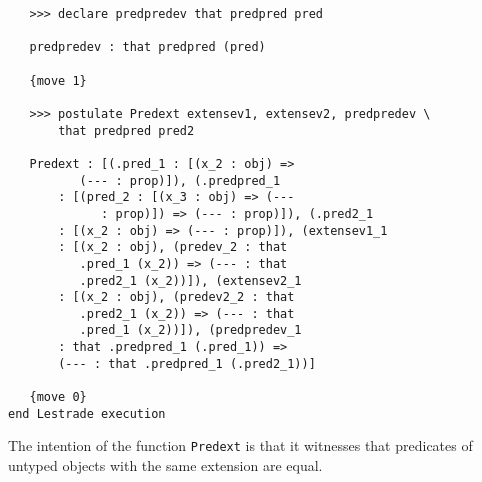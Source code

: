 \documentclass[12pt]{article}
\begin{document}
\begin{verbatim}
   >>> declare predpredev that predpred pred

   predpredev : that predpred (pred)

   {move 1}

   >>> postulate Predext extensev1, extensev2, predpredev \
       that predpred pred2

   Predext : [(.pred_1 : [(x_2 : obj) => 
          (--- : prop)]), (.predpred_1 
       : [(pred_2 : [(x_3 : obj) => (--- 
             : prop)]) => (--- : prop)]), (.pred2_1 
       : [(x_2 : obj) => (--- : prop)]), (extensev1_1 
       : [(x_2 : obj), (predev_2 : that 
          .pred_1 (x_2)) => (--- : that 
          .pred2_1 (x_2))]), (extensev2_1 
       : [(x_2 : obj), (predev2_2 : that 
          .pred2_1 (x_2)) => (--- : that 
          .pred_1 (x_2))]), (predpredev_1 
       : that .predpred_1 (.pred_1)) => 
       (--- : that .predpred_1 (.pred2_1))]

   {move 0}
end Lestrade execution

\end{verbatim}

The intention of the function {\tt Predext} is that it witnesses that predicates of untyped objects with the same extension are equal.
\end{document}
